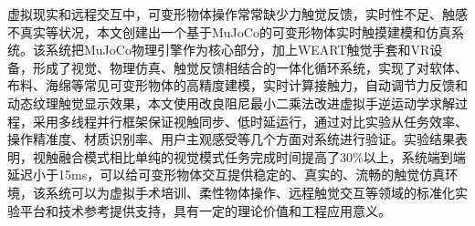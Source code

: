 \begin{abstractzh}

虚拟现实和远程交互中，可变形物体操作常常缺少力触觉反馈，实时性不足、触感不真实等状况，本文创建出一个基于MuJoCo的可变形物体实时触摸建模和仿真系统。该系统把MuJoCo物理引擎作为核心部分，加上WEART触觉手套和VR设备，形成了视觉、物理仿真、触觉反馈相结合的一体化循环系统，实现了对软体、布料、海绵等常见可变形物体的高精度建模，实时计算接触力，自动调节力反馈和动态纹理触觉显示效果，本文使用改良阻尼最小二乘法改进虚拟手逆运动学求解过程，采用多线程并行框架保证视触同步、低时延运行，通过对比实验从任务效率、操作精准度、材质识别率、用户主观感受等几个方面对系统进行验证。实验结果表明，视触融合模式相比单纯的视觉模式任务完成时间提高了30\%以上，系统端到端延迟小于15ms，可以给可变形物体交互提供稳定的、真实的、流畅的触觉仿真环境，该系统可以为虚拟手术培训、柔性物体操作、远程触觉交互等领域的标准化实验平台和技术参考提供支持，具有一定的理论价值和工程应用意义。

\end{abstractzh}
